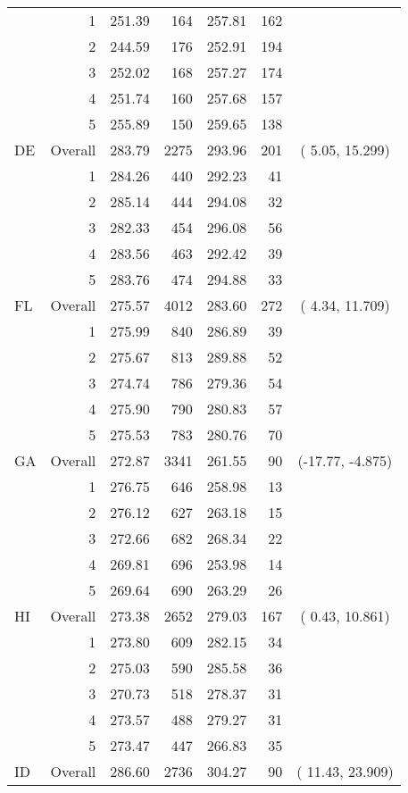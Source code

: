 \begin{longtable}{lrrr@{\extracolsep{.25cm}}rrc}
   & 1 & 251.39 & 164 & 257.81 & 162 &  \\ 
   & 2 & 244.59 & 176 & 252.91 & 194 &  \\ 
   & 3 & 252.02 & 168 & 257.27 & 174 &  \\ 
   & 4 & 251.74 & 160 & 257.68 & 157 &  \\ 
   & 5 & 255.89 & 150 & 259.65 & 138 &  \\ 
   \hline
DE & Overall & 283.79 & 2275 & 293.96 & 201 & (  5.05,  15.299) \\ 
   & 1 & 284.26 & 440 & 292.23 &  41 &  \\ 
   & 2 & 285.14 & 444 & 294.08 &  32 &  \\ 
   & 3 & 282.33 & 454 & 296.08 &  56 &  \\ 
   & 4 & 283.56 & 463 & 292.42 &  39 &  \\ 
   & 5 & 283.76 & 474 & 294.88 &  33 &  \\ 
   \hline
FL & Overall & 275.57 & 4012 & 283.60 & 272 & (  4.34,  11.709) \\ 
   & 1 & 275.99 & 840 & 286.89 &  39 &  \\ 
   & 2 & 275.67 & 813 & 289.88 &  52 &  \\ 
   & 3 & 274.74 & 786 & 279.36 &  54 &  \\ 
   & 4 & 275.90 & 790 & 280.83 &  57 &  \\ 
   & 5 & 275.53 & 783 & 280.76 &  70 &  \\ 
   \hline
GA & Overall & 272.87 & 3341 & 261.55 &  90 & (-17.77,  -4.875) \\ 
   & 1 & 276.75 & 646 & 258.98 &  13 &  \\ 
   & 2 & 276.12 & 627 & 263.18 &  15 &  \\ 
   & 3 & 272.66 & 682 & 268.34 &  22 &  \\ 
   & 4 & 269.81 & 696 & 253.98 &  14 &  \\ 
   & 5 & 269.64 & 690 & 263.29 &  26 &  \\ 
   \hline
HI & Overall & 273.38 & 2652 & 279.03 & 167 & (  0.43,  10.861) \\ 
   & 1 & 273.80 & 609 & 282.15 &  34 &  \\ 
   & 2 & 275.03 & 590 & 285.58 &  36 &  \\ 
   & 3 & 270.73 & 518 & 278.37 &  31 &  \\ 
   & 4 & 273.57 & 488 & 279.27 &  31 &  \\ 
   & 5 & 273.47 & 447 & 266.83 &  35 &  \\ 
   \hline
ID & Overall & 286.60 & 2736 & 304.27 &  90 & ( 11.43,  23.909) \\ 

\end{longtable}
